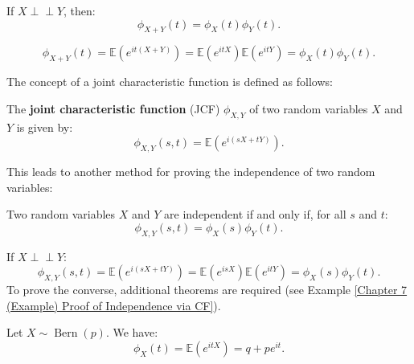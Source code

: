 \documentclass{huhtakm-template-book-v2}
\newcommand{\independent}{\perp\!\!\!\perp}
\newcommand{\expect}{\mathbb{E}}
\DeclareMathOperator{\Bern}{Bern}
\begin{document}
    \begin{thm}
        If $X \independent Y$, then:
        \begin{equation*}
            \phi_{X+Y}(t) = \phi_{X}(t)\phi_{Y}(t).
        \end{equation*}
    \end{thm}
    \begin{proofing}
        \begin{equation*}
            \phi_{X+Y}(t) = \expect(e^{it(X+Y)}) = \expect(e^{itX})\expect(e^{itY}) = \phi_{X}(t)\phi_{Y}(t).
        \end{equation*}
    \end{proofing}
    \newpage

    The concept of a joint characteristic function is defined as follows:
    \begin{defn}
        The \textbf{joint characteristic function} (JCF) $\phi_{X,Y}$ of two random variables $X$ and $Y$ is given by:
        \begin{equation*}
            \phi_{X,Y}(s, t) = \expect(e^{i(sX+tY)}).
        \end{equation*}
    \end{defn}
    This leads to another method for proving the independence of two random variables:
    \begin{thm}
        \label{Chapter 7 (Theorem) Independence via CF}
        Two random variables $X$ and $Y$ are independent if and only if, for all $s$ and $t$:
        \begin{equation*}
            \phi_{X,Y}(s, t) = \phi_{X}(s)\phi_{Y}(t).
        \end{equation*}
    \end{thm}
    \begin{proofing}
        If $X \independent Y$:
        \begin{equation*}
            \phi_{X,Y}(s, t) = \expect(e^{i(sX+tY)}) = \expect(e^{isX})\expect(e^{itY}) = \phi_{X}(s)\phi_{Y}(t).
        \end{equation*}
        To prove the converse, additional theorems are required (see Example \ref{Chapter 7 (Example) Proof of Independence via CF}).
    \end{proofing}
    \begin{eg}
        Let $X \sim \Bern(p)$. We have:
        \begin{equation*}
            \phi_{X}(t) = \expect(e^{itX}) = q+pe^{it}.
        \end{equation*}
    \end{eg}
\end{document}

